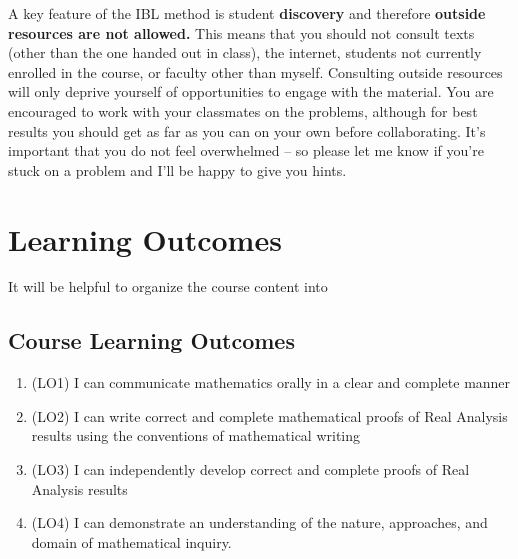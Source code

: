 \documentclass[
  letterpaper,
  DIV=11,
  numbers=noendperiod]{scrreprt}
\providecommand{\tightlist}{%
  \setlength{\itemsep}{0pt}\setlength{\parskip}{0pt}}\usepackage{longtable,booktabs,array}
\begin{document}
\begin{tcolorbox}[enhanced jigsaw, breakable, rightrule=.15mm, left=2mm, arc=.35mm, bottomrule=.15mm, colframe=quarto-callout-warning-color-frame, toprule=.15mm, leftrule=.75mm, opacityback=0, colback=white]
\begin{minipage}[t]{5.5mm}
\textcolor{quarto-callout-warning-color}{\faExclamationTriangle}
\end{minipage}%
\begin{minipage}[t]{\textwidth - 5.5mm}

A key feature of the IBL method is student \textbf{discovery} and
therefore \textbf{outside resources are not allowed.} This means that
you should not consult texts (other than the one handed out in class),
the internet, students not currently enrolled in the course, or faculty
other than myself. Consulting outside resources will only deprive
yourself of opportunities to engage with the material. You are
encouraged to work with your classmates on the problems, although for
best results you should get as far as you can on your own before
collaborating. It's important that you do not feel overwhelmed -- so
please let me know if you're stuck on a problem and I'll be happy to
give you hints.

\end{minipage}%
\end{tcolorbox}


\chapter{Learning Outcomes}\label{learning-outcomes}

It will be helpful to organize the course content into

\section{Course Learning Outcomes}\label{course-learning-outcomes}

\begin{enumerate}
\def\labelenumi{\arabic{enumi}.}
\tightlist
\item
  (LO1) I can communicate mathematics orally in a clear and complete
  manner
\item
  (LO2) I can write correct and complete mathematical proofs of Real
  Analysis results using the conventions of mathematical writing
\item
  (LO3) I can independently develop correct and complete proofs of Real
  Analysis results
\item
  (LO4) I can demonstrate an understanding of the nature, approaches,
  and domain of mathematical inquiry.
\end{enumerate}
\end{document}
